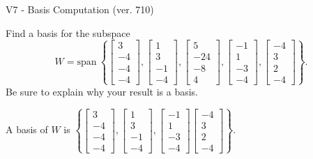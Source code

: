 \begin{exercise}
  \begin{exerciseTitle}V7 - Basis Computation (ver. 710)\end{exerciseTitle}
  \begin{exerciseStatement}
    Find a basis for the subspace 
\[W=\mathrm{span}\ \left\{\left[\begin{array}{r}
3 \\
-4 \\
-4 \\
-4
\end{array}\right] , \left[\begin{array}{r}
1 \\
3 \\
-1 \\
-4
\end{array}\right] , \left[\begin{array}{r}
5 \\
-24 \\
-8 \\
4
\end{array}\right] , \left[\begin{array}{r}
-1 \\
1 \\
-3 \\
-4
\end{array}\right] , \left[\begin{array}{r}
-4 \\
3 \\
2 \\
-4
\end{array}\right]\right\}.\]
 Be sure to explain why your result is a basis.


  \end{exerciseStatement}
  \begin{exerciseAnswer}
   A basis of \(W\) is  \(\left\{\left[\begin{array}{r}
3 \\
-4 \\
-4 \\
-4
\end{array}\right] , \left[\begin{array}{r}
1 \\
3 \\
-1 \\
-4
\end{array}\right] , \left[\begin{array}{r}
-1 \\
1 \\
-3 \\
-4
\end{array}\right] \left[\begin{array}{r}
-4 \\
3 \\
2 \\
-4
\end{array}\right]\right\}\).
  


  \end{exerciseAnswer}
\end{exercise}